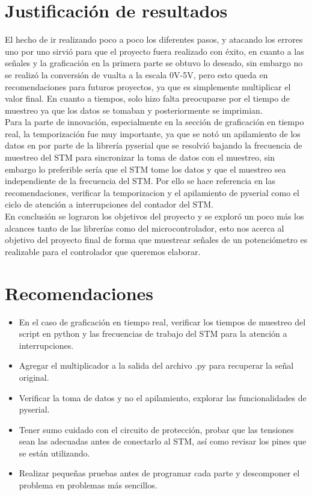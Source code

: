 \documentclass[letterpaper]{article}
\begin{document}
\newpage
\section{Justificación de resultados}
El hecho de ir realizando poco a poco los diferentes pasos, y atacando los errores uno por uno sirvió para que el proyecto fuera realizado con éxito, en cuanto a las señales y la graficación en la primera parte se obtuvo lo deseado, sin embargo no se realizó la conversión de vualta a la escala 0V-5V, pero esto queda en recomendaciones para futuros proyectos, ya que es simplemente multiplicar el valor final. En cuanto a tiempos, solo hizo falta preocuparse por el tiempo de muestreo ya que los datos se tomaban y posteriormente se imprimian.\\[0.2 cm]
Para la parte de innovación, especialmente en la sección de graficación en tiempo real, la temporización fue muy importante, ya que se notó un apilamiento de los datos en por parte de la librería pyserial que se resolvió bajando la frecuencia de muestreo del STM para sincronizar la toma de datos con el muestreo, sin embargo lo preferible sería que el STM tome los datos y que el muestreo sea independiente de la frecuencia del STM. Por ello se hace referencia en las recomendaciones, verificar la temporizacion y el apilamiento de pyserial como el ciclo de atención a interrupciones del contador del STM.\\[0.2 cm]
En conclusión se lograron los objetivos del proyecto y se exploró un poco más los alcances tanto de las librerías como del microcontrolador, esto nos acerca al objetivo del proyecto final de forma que muestrear señales de un potenciómetro es realizable para el controlador que queremos elaborar.

\newpage
\section{Recomendaciones}

\begin{itemize}
\item En el caso de graficación en tiempo real, verificar los tiempos de muestreo del script en python y las frecuencias de trabajo del STM para la atención a interrupciones.
\item Agregar el multiplicador a la salida del archivo .py para recuperar la señal original.
\item Verificar la toma de datos y no el apilamiento, explorar las funcionalidades de pyserial.
\item Tener sumo cuidado con el circuito de protección, probar que las tensiones sean las adecuadas antes de conectarlo al STM, así como revisar los pines que se están utilizando.
\item Realizar pequeñas pruebas antes de programar cada parte y descomponer el problema en problemas más sencillos.
\end{itemize}

 

\end{document}
